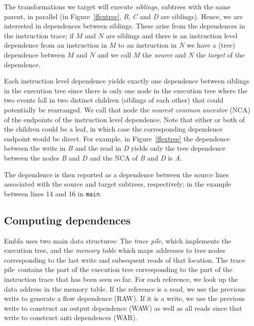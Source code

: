 \documentclass[times, 10pt,twocolumn]{article}
\begin{document}
The transformations we target will execute {\em siblings}, subtrees with
the same parent, in parallel (in Figure~\ref{ffextree}, {\it B}, {\it C} 
and {\it D} are siblings).  Hence, we 
are interested in dependences between siblings. These
arise from the 
dependences in the instruction trace; if $M$ and $N$ are siblings and
there is an instruction level dependence from an instruction in $M$ 
to an instruction in $N$ we have a (tree) dependence between $M$ and $N$
and we call $M$ the {\em source} and $N$ the {\em target} of the dependence.

Each instruction level dependence yields exactly one dependence
between siblings in the execution tree since there is only one node
in the execution tree  
where the two events fall in two distinct children (siblings of each other)
that could potentially be rearranged. We call that node the {\em nearest
common ancestor} (NCA) of the endpoints of the instruction level dependence.
Note that either or both of the children could be a leaf, in which case the
corresponding dependence endpoint would be direct.
For example, in Figure~\ref{ffextree}
the dependence between the write in {\it B} and the read in {\it D} yields
only the tree dependence between the nodes {\it B} and {\it D} and the NCA of
{\it B} and {\it D} is {\it A}. 

The dependence is then reported as a dependence between the source lines
associated with the source and target subtrees, respectively; in the example
between lines 14 and 16 in {\tt main}.

\newcommand{\tracepile}{trace pile}

\subsection{Computing dependences} \label{snca}

Embla uses two main data structures: The {\em \tracepile}, which implements 
the execution tree, and the {\em memory table} which maps addresses to tree
nodes corresponding to the last write and subsequent reads of that
location. The \tracepile\ contains the part of the execution tree
corresponding to the part of the instruction trace that has been
seen so far.
For each reference, we look up the data address in the memory 
table. If the reference is a read, we use the previous write to generate
a flow dependence (RAW). If it is a write, we use the previous write to 
construct an output dependence (WAW) as well as all reads since that 
write to construct anti dependences (WAR).
\end{document}
